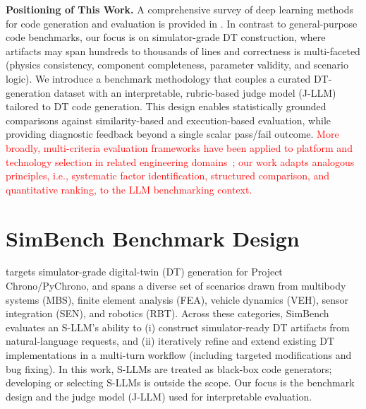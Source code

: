 \documentclass{ieeeaccess}
\newcommand{\updatedText}[1]{\textcolor{red}{#1}}
\begin{document}
\noindent\textbf{Positioning of This Work.}
A comprehensive survey of deep learning methods for code generation and evaluation is provided in \cite{wu2022surveydeeplearningmodelscodes}.
In contrast to general-purpose code benchmarks, our focus is on simulator-grade DT construction, where artifacts may span hundreds to thousands of lines and correctness is multi-faceted (physics consistency, component completeness, parameter validity, and scenario logic).
We introduce a benchmark methodology that couples a curated DT-generation dataset with an interpretable, rubric-based judge model (J-LLM) tailored to DT code generation.
This design enables statistically grounded comparisons against similarity-based and execution-based evaluation, while providing diagnostic feedback beyond a single scalar pass/fail outcome.
\updatedText{More broadly, multi-criteria evaluation frameworks have been applied to platform and technology selection in related engineering domains~\cite{contrerasMasse2020mcda}; our work adapts analogous principles, i.e., systematic factor identification, structured comparison, and quantitative ranking, to the LLM benchmarking context.}
 

\section{SimBench Benchmark Design}
\label{sec:simbench}
 targets simulator-grade digital-twin (DT) generation for Project Chrono/PyChrono, and spans a diverse set of scenarios drawn from multibody systems (MBS), finite element analysis (FEA), vehicle dynamics (VEH), sensor integration (SEN), and robotics (RBT). 
Across these categories, SimBench evaluates an S-LLM’s ability to (i) construct simulator-ready DT artifacts from natural-language requests, and (ii) iteratively refine and extend existing DT implementations in a multi-turn workflow (including targeted modifications and bug fixing). 
In this work, S-LLMs are treated as black-box code generators; developing or selecting S-LLMs is outside the scope. Our focus is the benchmark design and the judge model (J-LLM) used for interpretable evaluation.
\end{document}
